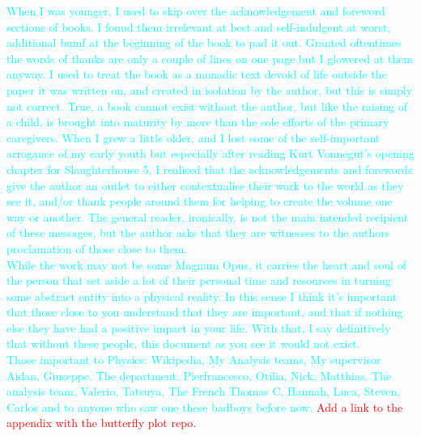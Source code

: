 \documentclass[12pt,titlepage,oneside]{book}
\newcommand{\tcr}[1]{\textcolor{red}{#1}} %
\newcommand{\tcc}[1]{\textcolor{cyan}{#1}} %
\begin{document}
\tcc{When I was younger, I used to skip over the acknowledgement and foreword sections of books. I found them irrelevant at best and self-indulgent at worst, additional bumf at the beginning of the book to pad it out. Granted oftentimes the words of thanks are only a couple of lines on one page but I glowered at them anyway. I used to treat the book as a monadic text devoid of life outside the paper it was written on, and created in isolation by the author, but this is simply not correct. True, a book cannot exist without the author, but like the raising of a child, is brought into maturity by more than the sole efforts of the primary caregivers. When I grew a little older, and I lost some of the self-important arrogance of my early youth  but especially after reading Kurt Vonnegut's opening chapter for Slaughterhouse 5, I realised that the acknowledgements and forewords give the author an outlet to either contextualise their work to the world as they see it, and/or thank people around them for helping to create the volume one way or another. The general reader, ironically, is not the main intended recipient of these messages, but the author asks that they are witnesses to the authors proclamation of those close to them.}\\ 

\tcc{While the work may not be some Magnum Opus, it carries the heart and soul of the person that set aside a lot of their personal time and resources in turning some abstract entity into a physical reality. In this sense I think it's important that those close to you understand that they are important, and that if nothing else they have had a positive impact in your life. With that, I say definitively that without these people, this document as you see it would not exist.} \\

\tcc{Those important to Physics: Wikipedia, My Analysis teams, My supervisor Aidan, Giuseppe. The department. Pierfrancesco, Otilia, Nick, Matthias. The analysis team. Valerio, Tatsuya, The French Thomas C, Hannah, Luca, Steven, Carlos and to anyone who saw one these badboys before now.} \tcr{Add a link to the appendix with the butterfly plot repo.} \\
\end{document}
